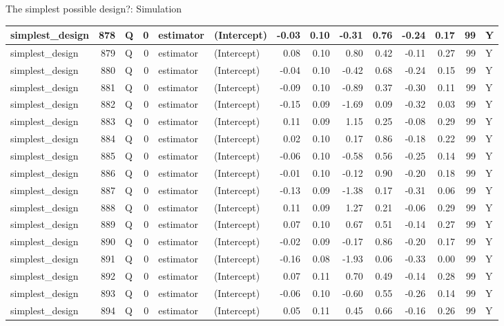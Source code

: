 \documentclass[
  11pt,
  ignorenonframetext,
]{beamer}
\begin{document}
\begin{frame}[fragile]{The simplest possible design?: Simulation}
\begin{tabular}{l|r|l|r|l|l|r|r|r|r|r|r|r|l}
\hline
simplest\_design & 878 & Q & 0 & estimator & (Intercept) & -0.03 & 0.10 & -0.31 & 0.76 & -0.24 & 0.17 & 99 & Y\\
\hline
simplest\_design & 879 & Q & 0 & estimator & (Intercept) & 0.08 & 0.10 & 0.80 & 0.42 & -0.11 & 0.27 & 99 & Y\\
\hline
simplest\_design & 880 & Q & 0 & estimator & (Intercept) & -0.04 & 0.10 & -0.42 & 0.68 & -0.24 & 0.15 & 99 & Y\\
\hline
simplest\_design & 881 & Q & 0 & estimator & (Intercept) & -0.09 & 0.10 & -0.89 & 0.37 & -0.30 & 0.11 & 99 & Y\\
\hline
simplest\_design & 882 & Q & 0 & estimator & (Intercept) & -0.15 & 0.09 & -1.69 & 0.09 & -0.32 & 0.03 & 99 & Y\\
\hline
simplest\_design & 883 & Q & 0 & estimator & (Intercept) & 0.11 & 0.09 & 1.15 & 0.25 & -0.08 & 0.29 & 99 & Y\\
\hline
simplest\_design & 884 & Q & 0 & estimator & (Intercept) & 0.02 & 0.10 & 0.17 & 0.86 & -0.18 & 0.22 & 99 & Y\\
\hline
simplest\_design & 885 & Q & 0 & estimator & (Intercept) & -0.06 & 0.10 & -0.58 & 0.56 & -0.25 & 0.14 & 99 & Y\\
\hline
simplest\_design & 886 & Q & 0 & estimator & (Intercept) & -0.01 & 0.10 & -0.12 & 0.90 & -0.20 & 0.18 & 99 & Y\\
\hline
simplest\_design & 887 & Q & 0 & estimator & (Intercept) & -0.13 & 0.09 & -1.38 & 0.17 & -0.31 & 0.06 & 99 & Y\\
\hline
simplest\_design & 888 & Q & 0 & estimator & (Intercept) & 0.11 & 0.09 & 1.27 & 0.21 & -0.06 & 0.29 & 99 & Y\\
\hline
simplest\_design & 889 & Q & 0 & estimator & (Intercept) & 0.07 & 0.10 & 0.67 & 0.51 & -0.14 & 0.27 & 99 & Y\\
\hline
simplest\_design & 890 & Q & 0 & estimator & (Intercept) & -0.02 & 0.09 & -0.17 & 0.86 & -0.20 & 0.17 & 99 & Y\\
\hline
simplest\_design & 891 & Q & 0 & estimator & (Intercept) & -0.16 & 0.08 & -1.93 & 0.06 & -0.33 & 0.00 & 99 & Y\\
\hline
simplest\_design & 892 & Q & 0 & estimator & (Intercept) & 0.07 & 0.11 & 0.70 & 0.49 & -0.14 & 0.28 & 99 & Y\\
\hline
simplest\_design & 893 & Q & 0 & estimator & (Intercept) & -0.06 & 0.10 & -0.60 & 0.55 & -0.26 & 0.14 & 99 & Y\\
\hline
simplest\_design & 894 & Q & 0 & estimator & (Intercept) & 0.05 & 0.11 & 0.45 & 0.66 & -0.16 & 0.26 & 99 & Y\\

\end{tabular}
\end{frame}
\end{document}
